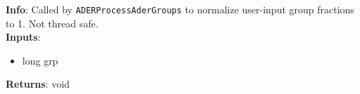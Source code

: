 \textbf{Info}: Called by \texttt{ADERProcessAderGroups} to normalize user-input
group fractions to 1. Not thread safe. \\

\noindent \textbf{Inputs}:
\begin{itemize}
\item{long grp}
\end{itemize}

\noindent \textbf{Returns}: void
